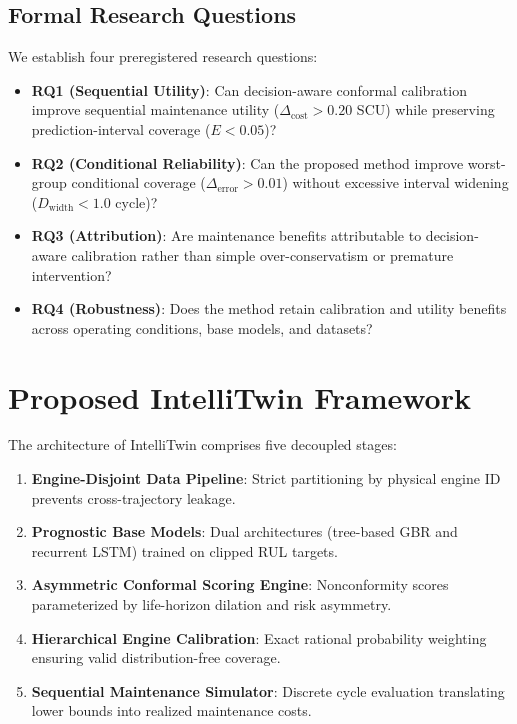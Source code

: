\documentclass[conference,a4paper]{IEEEtran}
\newcommand{\Deltacost}{\Delta_{\text{cost}}}
\newcommand{\Deltaerror}{\Delta_{\text{error}}}
\newcommand{\Dwidth}{D_{\text{width}}}
\begin{document}
\subsection{Formal Research Questions}
We establish four preregistered research questions:
\begin{itemize}
    \item \textbf{RQ1 (Sequential Utility)}: Can decision-aware conformal calibration improve sequential maintenance utility ($\Deltacost > 0.20$ SCU) while preserving prediction-interval coverage ($E < 0.05$)?
    \item \textbf{RQ2 (Conditional Reliability)}: Can the proposed method improve worst-group conditional coverage ($\Deltaerror > 0.01$) without excessive interval widening ($\Dwidth < 1.0$ cycle)?
    \item \textbf{RQ3 (Attribution)}: Are maintenance benefits attributable to decision-aware calibration rather than simple over-conservatism or premature intervention?
    \item \textbf{RQ4 (Robustness)}: Does the method retain calibration and utility benefits across operating conditions, base models, and datasets?
\end{itemize}

\section{Proposed IntelliTwin Framework}

The architecture of IntelliTwin comprises five decoupled stages:
\begin{enumerate}
    \item \textbf{Engine-Disjoint Data Pipeline}: Strict partitioning by physical engine ID prevents cross-trajectory leakage.
    \item \textbf{Prognostic Base Models}: Dual architectures (tree-based GBR and recurrent LSTM) trained on clipped RUL targets.
    \item \textbf{Asymmetric Conformal Scoring Engine}: Nonconformity scores parameterized by life-horizon dilation and risk asymmetry.
    \item \textbf{Hierarchical Engine Calibration}: Exact rational probability weighting ensuring valid distribution-free coverage.
    \item \textbf{Sequential Maintenance Simulator}: Discrete cycle evaluation translating lower bounds into realized maintenance costs.
\end{enumerate}
\end{document}
